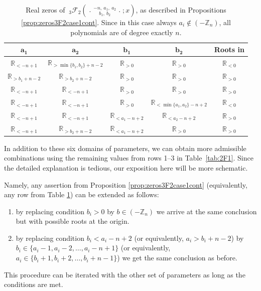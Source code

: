 \documentclass[reqno,11pt]{amsart}
\theoremstyle{remark}
\newcommand{\R}{\mathbb{R}}
\newcommand{\Z}{\mathbb{Z}}
\newcommand{\rr}{\mathbb{R}}
\newcommand*\pFq[5]{%
 {\ }_{#1}{\mathcal F}_{#2}{\left(\genfrac..{0pt}{}{#3}{#4};#5\right)}%
}
\begin{document}
\begin{table}[h]
    \centering
    \begin{tabular}{|c|c|c|c|c|}
\hline $\mathbf{a_1}$ & $\mathbf{a_2}$  & $ \mathbf{b_1}$  & $ \mathbf{b_2}$  & \textbf{Roots in} \\
\hline $ \R_{<-n+1}$ & $ \R_{>\min \{b_1, b_2 \}+n-2}$ & $\rr_{>0}$ & $\R_{> 0}$ & $\R_{< 0}$  \\ 
\hline $ \R_{>b_1+n-2}$ & $ \R_{> b_2  +n-2}$ & $\rr_{>0}$ & $\R_{> 0}$ & $\R_{> 0}$  \\ 
\hline $ \R_{<-n+1}$ & $\R_{<-n+1}$ & $\rr_{>0}$ & $\R_{> 0}$ & $\R_{> 0}$  \\ 
\hline $ \R_{<-n+1}$ & $ \R_{<-n+1}$ & $\rr_{>0}$ & $ \R_{<\min \{a_1, a_2 \}-n+2}$ & $\R_{< 0}$  \\ 
\hline $ \R_{<-n+1}$ & $ \R_{<-n+1}$ & $ \R_{<a_1-n+2}$ & $ \R_{<a_2-n+2}$ & $\R_{> 0}$  \\ 
\hline $ \R_{<-n+1}$ & $ \R_{> b_2  +n-2}$ & $ \R_{<a_1-n+2}$ & $\R_{> 0}$ & $\R_{> 0}$  \\ 
\hline
\end{tabular}
\vspace{2mm}
\caption{Real zeros of $\pFq{3}{2}{-n, \ a_1, \  a_2}{   b_1, \ b_2}{x}$, as described in Propositions \ref{prop:zeros3F2case1cont}.  Since in this case always $
  a_i \notin (-\Z_n)  $, all polynomials are of degree exactly $n$. 
 }
    \label{tab:3F2Case1major}
\end{table}

In addition to these six domains of parameters, we can obtain more admissible combinations using the remaining values from rows 1--3 in Table~\ref{tab:2F1}. Since the detailed explanation is tedious, our exposition here will be more schematic.

Namely, any assertion from Proposition \ref{prop:zeros3F2case1cont} (equivalently, any row from Table \ref{tab:3F2Case1major}) can be extended as follows:
\begin{enumerate} 
    \item[(R1)] by replacing condition $b_i>0$ by $b \in (-\Z_n)$ we arrive at the same conclusion but with possible roots at the origin. 
    \item[(R2)] by replacing condition $b_i<a_i-n+2$ (or equivalently, $a_i>b_i+n-2$) by $b_i\in \{a_i-1,a_i-2,\dots, a_i-n+1\}$ (or equivalently, $a_i \in \{ b_i+1,b_i+2,\dots, b_i+n-1\}$) we get the same conclusion as before. 
\end{enumerate}
This procedure can be iterated with the other set of parameters as long as the conditions are met. 
\end{document}
